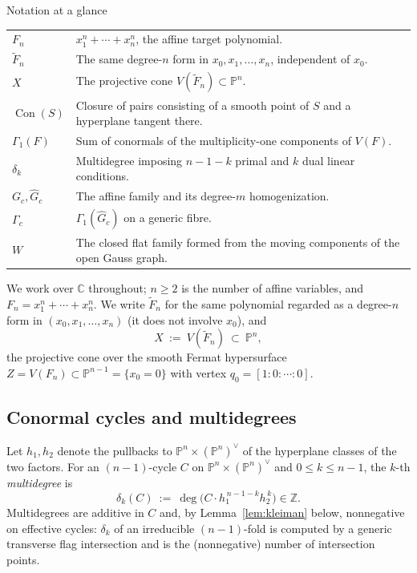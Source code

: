 \documentclass[acmsmall,screen,nonacm]{acmart}
\theoremstyle{definition}
\theoremstyle{remark}
\DeclareMathOperator{\Con}{Con}
\newcommand{\PP}{\mathbb{P}}
\newcommand{\CC}{\mathbb{C}}
\newcommand{\pdeg}{\delta}
\newcommand{\Gone}{\Gamma_{\!1}}
\begin{document}
\begin{detailbox}{Notation at a glance}
\begin{tabularx}{\textwidth}{@{}p{}X@{}}
$F_n$ & $x_1^n+\cdots+x_n^n$, the affine target polynomial. \\
$\widetilde F_n$ & The same degree-$n$ form in $x_0,x_1,\ldots,x_n$, independent of $x_0$. \\
$X$ & The projective cone $V(\widetilde F_n)\subset\PP^n$. \\
$\Con(S)$ & Closure of pairs consisting of a smooth point of $S$ and a hyperplane tangent there. \\
$\Gone(F)$ & Sum of conormals of the multiplicity-one components of $V(F)$. \\
$\pdeg_k$ & Multidegree imposing $n-1-k$ primal and $k$ dual linear conditions. \\
$G_c,\widehat G_c$ & The affine family and its degree-$m$ homogenization. \\
$\Gamma_c$ & $\Gone(\widehat G_c)$ on a generic fibre. \\
$W$ & The closed flat family formed from the moving components of the open Gauss graph. \\
\end{tabularx}
\end{detailbox}

We work over $\CC$ throughout; $n\ge2$ is the number of affine
variables, and $F_n=x_1^n+\cdots+x_n^n$.  We write $\widetilde F_n$
for the same polynomial regarded as a degree-$n$ form in
$(x_0,x_1,\dots,x_n)$ (it does not involve $x_0$), and
\[
  X\ :=\ V(\widetilde F_n)\ \subset\ \PP^n,
\]
the projective cone over the smooth Fermat hypersurface
$Z=V(F_n)\subset\PP^{n-1}=\{x_0=0\}$ with vertex
$q_0=[1:0:\cdots:0]$.

\subsection{Conormal cycles and multidegrees}

Let $h_1,h_2$ denote the pullbacks to $\PP^n\times(\PP^n)^\vee$ of the
hyperplane classes of the two factors.  For an $(n-1)$-cycle $C$ on
$\PP^n\times(\PP^n)^\vee$ and $0\le k\le n-1$, the $k$-th
\emph{multidegree} is
\[
  \pdeg_k(C)\ :=\ \deg\big(C\cdot h_1^{\,n-1-k}h_2^{\,k}\big)\in\mathbb Z .
\]
Multidegrees are additive in $C$ and, by
Lemma~\ref{lem:kleiman} below, nonnegative on effective cycles:
$\pdeg_k$ of an irreducible $(n-1)$-fold is computed by a generic
transverse flag intersection and is the (nonnegative) number of
intersection points.
\end{document}
